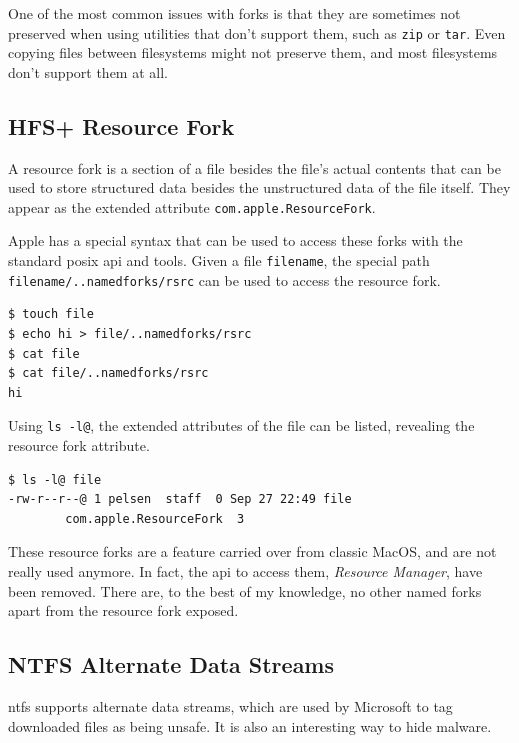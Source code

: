 \documentclass[a4paper]{article}
\begin{document}
One of the most common issues with forks is that they are sometimes not preserved when using utilities that don't support them, such as \verb|zip| or \verb|tar|. Even copying files between filesystems might not preserve them, and most filesystems don't support them at all. 

\subsection{HFS+ Resource Fork}

A resource fork is a section of a file besides the file's actual contents that can be used to store structured data besides the unstructured data of the file itself. They appear as the extended attribute \verb|com.apple.ResourceFork|. 

Apple has a special syntax that can be used to access these forks with the standard \gls{posix} \gls{api} and tools. Given a file \verb|filename|, the special path \verb|filename/..namedforks/rsrc| can be used to access the resource fork.

\begin{verbatim}
$ touch file
$ echo hi > file/..namedforks/rsrc
$ cat file
$ cat file/..namedforks/rsrc
hi  
\end{verbatim}

Using \verb|ls -l@|, the extended attributes of the file can be listed, revealing the resource fork attribute.

\begin{verbatim}
$ ls -l@ file
-rw-r--r--@ 1 pelsen  staff  0 Sep 27 22:49 file
        com.apple.ResourceFork  3  
\end{verbatim}
These resource forks are a feature carried over from classic MacOS, and are not really used anymore. In fact, the \gls{api} to access them, \emph{Resource Manager}, have been removed. There are, to the best of my knowledge, no other named forks apart from the resource fork exposed.

\subsection{NTFS Alternate Data Streams}


\gls{ntfs} supports alternate data streams, which are used by Microsoft to tag downloaded files as being unsafe. It is also an interesting way to hide malware.
\end{document}
